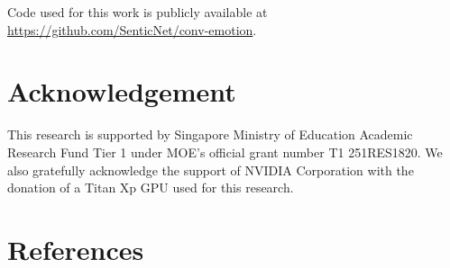 \documentclass[preprint,3pt]{elsarticle}
\begin{document}
Code used for this work is publicly available at \url{https://github.com/SenticNet/conv-emotion}.

\section*{Acknowledgement}
This research is supported by Singapore Ministry of Education Academic
Research Fund Tier 1 under MOE's official grant number T1 251RES1820.
We also gratefully acknowledge the support of NVIDIA Corporation with the
donation of a Titan Xp GPU used for this research.

\section*{References}



\end{document}
